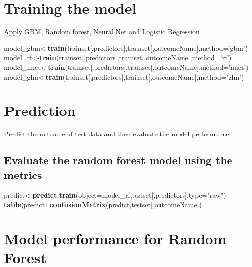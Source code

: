 \documentclass[]{article}
\newenvironment{Shaded}{\begin{snugshade}}{\end{snugshade}}
\newcommand{\KeywordTok}[1]{\textcolor[rgb]{0.13,0.29,0.53}{\textbf{#1}}}
\newcommand{\DataTypeTok}[1]{\textcolor[rgb]{0.13,0.29,0.53}{#1}}
\newcommand{\StringTok}[1]{\textcolor[rgb]{0.31,0.60,0.02}{#1}}
\newcommand{\NormalTok}[1]{#1}
\begin{document}
\section{Training the model}\label{training-the-model}

Apply GBM, Random forest, Neural Net and Logistic Regression

\begin{Shaded}
\begin{Highlighting}[]
\NormalTok{model_gbm<-}\KeywordTok{train}\NormalTok{(trainset[,predictors],trainset[,outcomeName],}\DataTypeTok{method=}\StringTok{'gbm'}\NormalTok{)}
\NormalTok{model_rf<-}\KeywordTok{train}\NormalTok{(trainset[,predictors],trainset[,outcomeName],}\DataTypeTok{method=}\StringTok{'rf'}\NormalTok{)}
\NormalTok{model_nnet<-}\KeywordTok{train}\NormalTok{(trainset[,predictors],trainset[,outcomeName],}\DataTypeTok{method=}\StringTok{'nnet'}\NormalTok{)}
\NormalTok{model_glm<-}\KeywordTok{train}\NormalTok{(trainset[,predictors],trainset[,outcomeName],}\DataTypeTok{method=}\StringTok{'glm'}\NormalTok{)}
\end{Highlighting}
\end{Shaded}

\section{Prediction}\label{prediction}

Predict the outcome of test data and then evaluate the model performance

\subsection{Evaluate the random forest model using the
metrics}\label{evaluate-the-random-forest-model-using-the-metrics}

\begin{Shaded}
\begin{Highlighting}[]
\NormalTok{predict<-}\KeywordTok{predict.train}\NormalTok{(}\DataTypeTok{object=}\NormalTok{model_rf,testset[,predictors],}\DataTypeTok{type=}\StringTok{"raw"}\NormalTok{)}
\KeywordTok{table}\NormalTok{(predict)}
\KeywordTok{confusionMatrix}\NormalTok{(predict,testset[,outcomeName])}
\end{Highlighting}
\end{Shaded}

\section{Model performance for Random
Forest}\label{model-performance-for-random-forest}
\end{document}
